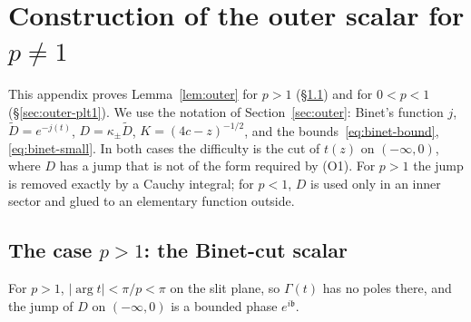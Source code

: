 \providecommand{\eps}{\varepsilon}
\providecommand{\Log}{\operatorname{Log}}
\providecommand{\re}{\operatorname{Re}}
\providecommand{\im}{\operatorname{Im}}
\providecommand{\thlip}{\vartheta_{\mathrm{lip}}}
\providecommand{\thseam}{\vartheta_{\mathrm{seam}}}
\providecommand{\thw}{\vartheta_{\mathrm{w}}}
\providecommand{\Ob}{\Omega_{\mathrm{b}}}
\providecommand{\Sin}{S_{\mathrm{in}}}
\providecommand{\Sout}{S_{\mathrm{out}}}
\providecommand{\Zn}{\mathcal{Z}_n}
\providecommand{\Sseam}{\Sigma^{\mathrm{s}}}

\section{\texorpdfstring{Construction of the outer scalar for $p\ne1$}{Construction of the outer scalar for p different from 1}}\label{app:outer}

This appendix proves Lemma~\ref{lem:outer} for $p>1$ (\S\ref{sec:outer-pgt1}) and for $0<p<1$
(\S\ref{sec:outer-plt1}). We use the notation of Section~\ref{sec:outer}: Binet's function $j$, $\tilde D=e^{-j(t)}$,
$D=\kappa_\pm\tilde D$, $K=(4c-z)^{-1/2}$, and the bounds~\eqref{eq:binet-bound}, \eqref{eq:binet-small}. In both cases
the difficulty is the cut of $t(z)$ on $(-\infty,0)$, where $D$ has a jump that is not of the form required by (O1).
For $p>1$ the jump is removed exactly by a Cauchy integral; for $p<1$, $D$ is used only in an inner sector and glued
to an elementary function outside.

\subsection{\texorpdfstring{The case $p>1$: the Binet-cut scalar}{The case p>1: the Binet-cut scalar}}\label{sec:outer-pgt1}
For $p>1$, $|\arg t|<\pi/p<\pi$ on the slit plane, so $\Gamma(t)$ has no poles there, and the jump of $D$ on
$(-\infty,0)$ is a bounded phase $e^{i\mathfrak b}$.

